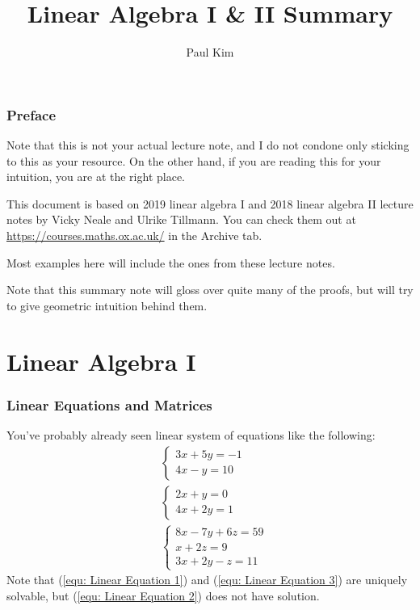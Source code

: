 \documentclass[12pt, a4paper]{article}
\title{Linear Algebra I \& II Summary}
\author{Paul Kim}
\theoremstyle{remark}
\theoremstyle{definition}
\numberwithin{equation}{section}
\numberwithin{definition}{section}
\numberwithin{example}{section}
\numberwithin{exercise}{section}
\numberwithin{remark}{section}
\numberwithin{figure}{section}
\begin{document}
\maketitle

\section*{Preface}
Note that this is not your actual lecture note,
and I do not condone only sticking to this as your resource.
On the other hand, if you are reading this for your intuition,
you are at the right place.

This document is based on 2019 linear algebra I and 2018 linear algebra II lecture notes by Vicky Neale and Ulrike Tillmann.
You can check them out at \url{https://courses.maths.ox.ac.uk/} in the Archive tab.

Most examples here will include the ones from these lecture notes.

Note that this summary note will gloss over quite many of the proofs, but will try to give geometric intuition behind them.

\newpage
\part{Linear Algebra I}
\newpage

\section{Linear Equations and Matrices}
You've probably already seen linear system of equations like the following:
\begin{align}
    &
    \begin{cases}
        3x + 5y = -1 \\
        4x - y = 10
    \end{cases}
    \label{equ: Linear Equation 1}
    \\
    &
    \begin{cases}
        2x + y = 0 \\
        4x + 2y = 1
    \end{cases}
    \label{equ: Linear Equation 2}
    \\
    &
    \begin{cases}
        8x - 7y + 6z = 59 \\
        x + 2z = 9 \\
        3x + 2y - z = 11
    \end{cases}
    \label{equ: Linear Equation 3}
\end{align}
Note that (\ref{equ: Linear Equation 1}) and (\ref{equ: Linear Equation 3}) are uniquely solvable, but (\ref{equ: Linear Equation 2}) does not have solution.
\end{document}
